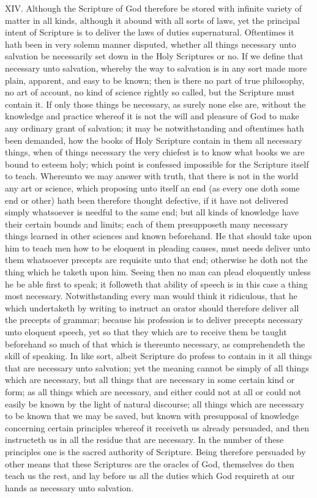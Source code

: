 XIV. Although the Scripture of God therefore be stored with infinite variety of matter in all kinds, although it abound with all sorts of laws, yet the principal intent of Scripture is to deliver the laws of duties supernatural. Oftentimes it hath been in very solemn manner disputed, whether all things necessary unto salvation be necessarily set down in the Holy Scriptures or no. If we define that necessary unto salvation, whereby the way to salvation is in any sort made more plain, apparent, and easy to be known; then is there no part of true philosophy, no art of account, no kind of science rightly so called, but the Scripture must contain it. If only those things be necessary, as surely none else are, without the knowledge and practice whereof it is not the will and pleasure of God to make any ordinary grant of salvation; it may be notwithstanding and oftentimes hath been demanded, how the books of Holy Scripture contain in them all necessary things, when of things necessary the very chiefest is to know what books we are bound to esteem holy; which point is confessed impossible for the Scripture itself to teach. Whereunto we may answer with truth, that there is not in the world any art or science, which proposing unto itself an end (as every one doth some end or other) hath been therefore thought defective, if it have not delivered simply whatsoever is needful to the same end; but all kinds of knowledge have their certain bounds and limits; each  of them presupposeth many necessary things learned in other sciences and known beforehand. He that should take upon him to teach men how to be eloquent in pleading causes, must needs deliver unto them whatsoever precepts are requisite unto that end; otherwise he doth not the thing which he taketh upon him. Seeing then no man can plead eloquently unless he be able first to speak; it followeth that ability of speech is in this case a thing most necessary. Notwithstanding every man would think it ridiculous, that he which undertaketh by writing to instruct an orator should therefore deliver all the precepts of grammar; because his profession is to deliver precepts necessary unto eloquent speech, yet so that they which are to receive them be taught beforehand so much of that which is thereunto necessary, as comprehendeth the skill of speaking. In like sort, albeit Scripture do profess to contain in it all things that are necessary unto salvation; yet the meaning cannot be simply of all things which are necessary, but all things that are necessary in some certain kind or form; as all things which are necessary, and either could not at all or could not easily be known by the light of natural discourse; all things which are necessary to be known that we may be saved, but known with presupposal of knowledge concerning certain principles whereof it receiveth us already persuaded, and then instructeth us in all the residue that are necessary. In the number of these principles one is the sacred authority of Scripture. Being therefore persuaded by other means that these Scriptures are the oracles of God, themselves do then teach us the rest, and lay before us all the duties which God requireth at our hands as necessary unto salvation.

